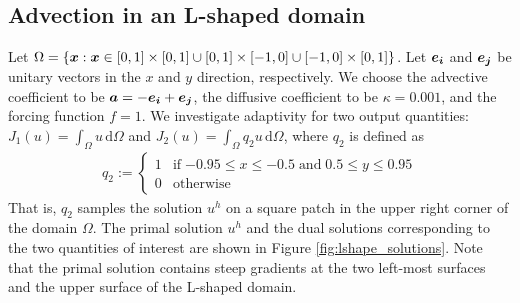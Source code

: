 \subsection{Advection in an L-shaped domain}

Let $\Omega = \{ \boldsymbol{x} :
\boldsymbol{x} \in [0,1] \times [0,1] \cup [0,1] \times [-1,0]
\cup [-1,0] \times [0,1] \}$.
Let $\boldsymbol{e_i}$ and $\boldsymbol{e_j}$ be unitary
vectors in the $x$ and $y$ direction, respectively.
We choose the advective coefficient to be
$\boldsymbol{a} = -\boldsymbol{e_i} + \boldsymbol{e_j}$, the diffusive
coefficient to be $\kappa = 0.001$, and the forcing
function $f=1$. We investigate adaptivity
for two output quantities:
$J_1(u) = \int_{\Omega} u \, \text{d} \Omega$ and
$J_2(u) = \int_{\Omega} q_2 u \, \text{d} \Omega$,
where $q_2$ is defined as
%
\begin{gather}
q_2 :=
\begin{cases}
1 & \text{if} \; {-0.95} \leq x \leq {-0.5} \;
\text{and} \; 0.5 \leq y \leq 0.95 \\
0 & \text{otherwise}
\end{cases}
\end{gather}
%
That is, $q_2$ samples the solution $u^h$ on a square
patch in the upper right corner of the domain $\Omega$.
The primal solution $u^h$ and the dual solutions corresponding
to the two quantities of interest are shown in Figure
\ref{fig:lshape_solutions}. Note that the primal solution
contains steep gradients at the two left-most surfaces
and the upper surface of the L-shaped domain.


